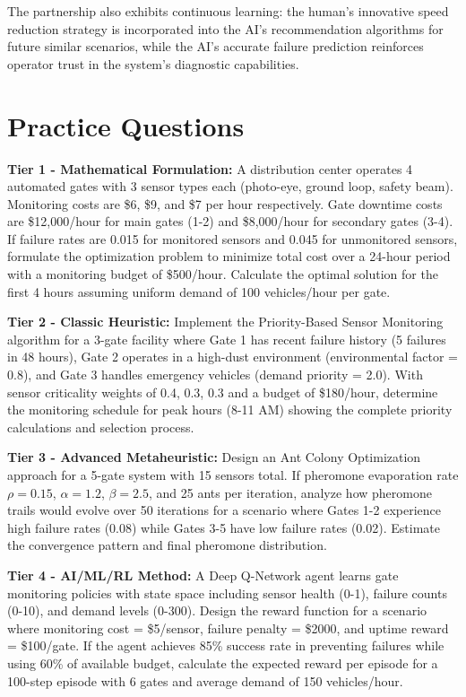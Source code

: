 \documentclass{article}
\begin{document}
The partnership also exhibits continuous learning: the human's innovative speed reduction strategy is incorporated into the AI's recommendation algorithms for future similar scenarios, while the AI's accurate failure prediction reinforces operator trust in the system's diagnostic capabilities.

\section{Practice Questions}

\textbf{Tier 1 - Mathematical Formulation:}
A distribution center operates 4 automated gates with 3 sensor types each (photo-eye, ground loop, safety beam). Monitoring costs are \$6, \$9, and \$7 per hour respectively. Gate downtime costs are \$12,000/hour for main gates (1-2) and \$8,000/hour for secondary gates (3-4). If failure rates are 0.015 for monitored sensors and 0.045 for unmonitored sensors, formulate the optimization problem to minimize total cost over a 24-hour period with a monitoring budget of \$500/hour. Calculate the optimal solution for the first 4 hours assuming uniform demand of 100 vehicles/hour per gate.

\textbf{Tier 2 - Classic Heuristic:}
Implement the Priority-Based Sensor Monitoring algorithm for a 3-gate facility where Gate 1 has recent failure history (5 failures in 48 hours), Gate 2 operates in a high-dust environment (environmental factor = 0.8), and Gate 3 handles emergency vehicles (demand priority = 2.0). With sensor criticality weights of 0.4, 0.3, 0.3 and a budget of \$180/hour, determine the monitoring schedule for peak hours (8-11 AM) showing the complete priority calculations and selection process.

\textbf{Tier 3 - Advanced Metaheuristic:}
Design an Ant Colony Optimization approach for a 5-gate system with 15 sensors total. If pheromone evaporation rate $\rho = 0.15$, $\alpha = 1.2$, $\beta = 2.5$, and 25 ants per iteration, analyze how pheromone trails would evolve over 50 iterations for a scenario where Gates 1-2 experience high failure rates (0.08) while Gates 3-5 have low failure rates (0.02). Estimate the convergence pattern and final pheromone distribution.

\textbf{Tier 4 - AI/ML/RL Method:}
A Deep Q-Network agent learns gate monitoring policies with state space including sensor health (0-1), failure counts (0-10), and demand levels (0-300). Design the reward function for a scenario where monitoring cost = \$5/sensor, failure penalty = \$2000, and uptime reward = \$100/gate. If the agent achieves 85\% success rate in preventing failures while using 60\% of available budget, calculate the expected reward per episode for a 100-step episode with 6 gates and average demand of 150 vehicles/hour.
\end{document}
